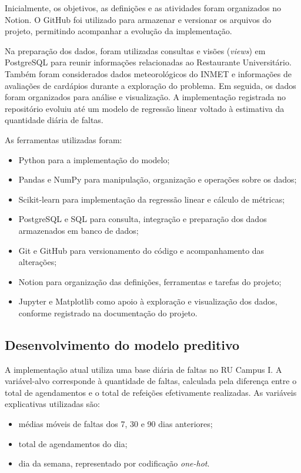 \documentclass[11pt,a4paper]{article}
\begin{document}
Inicialmente, os objetivos, as definições e as atividades foram organizados no Notion. O GitHub foi utilizado para armazenar e versionar os arquivos do projeto, permitindo acompanhar a evolução da implementação.

Na preparação dos dados, foram utilizadas consultas e visões (\textit{views}) em PostgreSQL para reunir informações relacionadas ao Restaurante Universitário. Também foram considerados dados meteorológicos do INMET e informações de avaliações de cardápios durante a exploração do problema. Em seguida, os dados foram organizados para análise e visualização. A implementação registrada no repositório evoluiu até um modelo de regressão linear voltado à estimativa da quantidade diária de faltas.

As ferramentas utilizadas foram:
\begin{itemize}
    \item Python para a implementação do modelo;
    \item Pandas e NumPy para manipulação, organização e operações sobre os dados;
    \item Scikit-learn para implementação da regressão linear e cálculo de métricas;
    \item PostgreSQL e SQL para consulta, integração e preparação dos dados armazenados em banco de dados;
    \item Git e GitHub para versionamento do código e acompanhamento das alterações;
    \item Notion para organização das definições, ferramentas e tarefas do projeto;
    \item Jupyter e Matplotlib como apoio à exploração e visualização dos dados, conforme registrado na documentação do projeto.
\end{itemize}

\subsection{Desenvolvimento do modelo preditivo}

A implementação atual utiliza uma base diária de faltas no RU Campus I. A variável-alvo corresponde à quantidade de faltas, calculada pela diferença entre o total de agendamentos e o total de refeições efetivamente realizadas. As variáveis explicativas utilizadas são:

\begin{itemize}
    \item médias móveis de faltas dos 7, 30 e 90 dias anteriores;
    \item total de agendamentos do dia;
    \item dia da semana, representado por codificação \textit{one-hot}.
\end{itemize}
\end{document}

